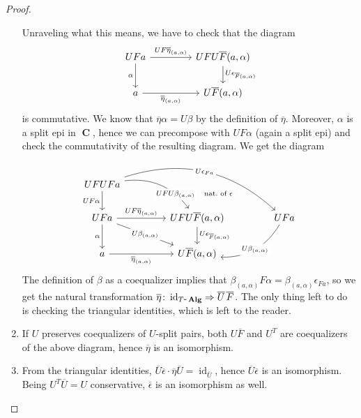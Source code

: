 \documentclass[a4paper,11pt,twoside, openany]{book}
\DeclareMathOperator{\Alg}{\mathbf{Alg}}
\DeclareMathOperator{\C}{\mathbf{C}}
\DeclareMathOperator{\id}{id}
\theoremstyle{definition}
\theoremstyle{definition}
\theoremstyle{remark}
\begin{document}
\begin{proof}
\begin{enumerate}
			Unraveling what this means, we have to check that the diagram
			\[
			\begin{tikzcd}[column sep=1.5cm]
			UFa\ar[r, "UF\overline{\eta}_{(a,\alpha)}"]\ar[d,"\alpha"']
			& UFU\overline{F}(a,\alpha)\ar[d, "U\epsilon_{\overline{F}(a,\alpha)}"] \\
			a\ar[r, "\overline{\eta}_{(a,\alpha)}"']
			& U\overline{F}(a,\alpha)
			\end{tikzcd}
			\]	
			is commutative. We know that $\overline{\eta}\alpha=U\beta$ by the definition of $\overline{\eta}$. Moreover, $\alpha$ is a split epi in $\C$, hence we can precompose with $UF\alpha$ (again a split epi) and check the commutativity of the resulting diagram. We get the diagram
			\[
			\begin{tikzcd}[column sep=1.5cm]
			UFUFa\arrow[d, "UF\alpha"'] \arrow[rd, bend left, near end, "UFU\beta_{(a,\alpha)}"description] \arrow[rrd, bend left, "U\epsilon_{Fa}"description] &            & \ar[lld,draw=none, near start,"\hspace{-1.5cm}\text{nat.\ of\ } \epsilon" description]  \\
			UFa\arrow[d, "\alpha"'] \arrow[r, "UF\overline{\eta}_{(a,\alpha)}"] \arrow[rd, "U\beta_{(a,\alpha)}"description]                        & UFU\overline{F}(a,\alpha)  \arrow[d, "U\epsilon_{\overline{F}(a,\alpha)}"] &        UFa           \arrow[ld, bend left, "U\beta_{(a,\alpha)}"description]      \\
			a\arrow[r, "\overline{\eta}_{(a,\alpha)}"']                                             &     U\overline{F}(a,\alpha)       &                        
			\end{tikzcd}
			\]
			The definition of $\beta$ as a coequalizer implies that $\beta_{(a,\alpha)}F\alpha=\beta_{(a,\alpha)}\epsilon_{Fa}$, so we get the natural transformation $\overline{\eta}\colon\id_{T\mbox{-}\Alg}\Rightarrow\overline{U}\hspace{.5mm}\overline{F}$. The only thing left to do is checking the triangular identities, which is left to the reader.
			
			\item If $U$ preserves coequalizers of $U$-split pairs, both $U\overline{F}$ and $U^T$ are coequalizers of the above diagram, hence $\overline{\eta}$ is an isomorphism.
			
			\item From the triangular identities, $\overline{U}\overline{\epsilon}\cdot\overline{\eta}\overline{U}=\id_{\overline{U}}$, hence $\overline{U}\overline{\epsilon}$ is an isomorphism. Being $U^T\overline{U}=U$ conservative, $\overline{\epsilon}$ is an isomorphism as well. \qedhere
		\end{enumerate}
	\end{proof}
	
\end{document}

